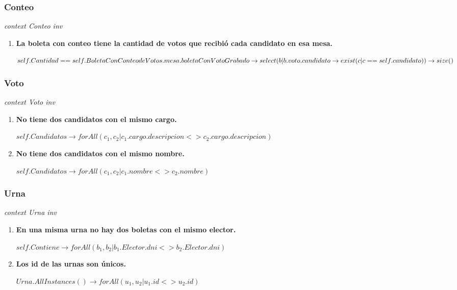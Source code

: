 \subsubsection*{Conteo}

\textit{context Conteo
inv}

\begin{enumerate}

\item \textbf{La boleta con conteo tiene la cantidad de votos que recibi\'o cada candidato en esa mesa.}

$self.Cantidad == \\
self.BoletaConConteodeVotos.mesa.boletaConVotoGrabado \rightarrow \\
select(b | b.voto.candidato  \rightarrow exist(c | c==self.candidato)) \rightarrow size() $

\end{enumerate}

\subsubsection*{Voto}

\textit{context Voto
inv}

\begin{enumerate}
\item \textbf{No tiene dos candidatos con el mismo cargo.}

$self.Candidatos  \rightarrow forAll(c_1, c_2 | c_1.cargo.descripcion <> c_2.cargo.descripcion)$

\item \textbf{No tiene dos candidatos con el mismo nombre.}

$self.Candidatos  \rightarrow forAll(c_1, c_2 | c_1.nombre <> c_2.nombre)$

\end{enumerate}

\subsubsection*{Urna}

\textit{context Urna
inv}

\begin{enumerate}

\item \textbf{En una misma urna no hay dos boletas con el mismo elector.}    

$self.Contiene \rightarrow forAll(b_1, b_2 | b_1.Elector.dni<>b_2.Elector.dni)$

\item \textbf{Los id de las urnas son únicos.}

$Urna.AllInstances() \rightarrow forAll(u_1, u_2|u_1.id<>u_2.id)$
\end{enumerate}

